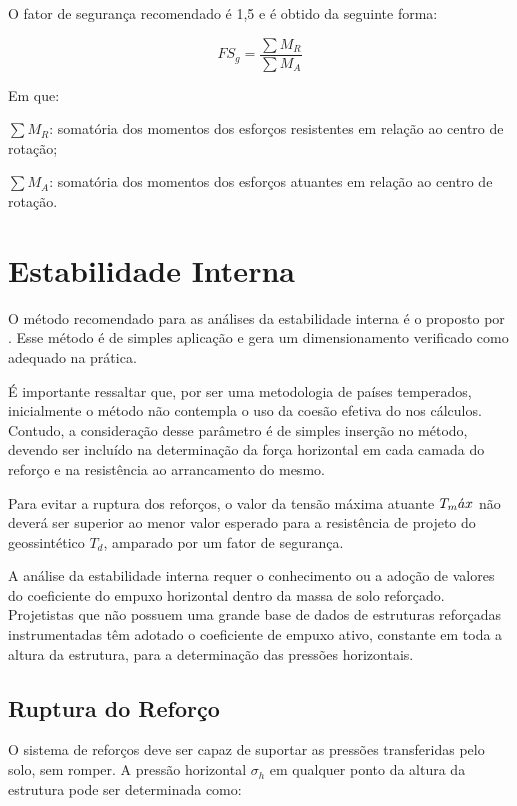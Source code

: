O fator de segurança recomendado é 1,5 e é obtido da seguinte forma:

\begin{equation}
    FS_g = \frac{\sum M_R}{\sum M_A}
\end{equation}

Em que:

$\sum M_R$: somatória dos momentos dos esforços resistentes em relação ao centro de rotação;

$\sum M_A$: somatória dos momentos dos esforços atuantes em relação ao centro de rotação.
 
 
\section{Estabilidade Interna}
 
O método recomendado para as análises da estabilidade interna é o proposto por . Esse método é de simples aplicação e gera um dimensionamento verificado como adequado na prática.

É importante ressaltar que, por ser uma metodologia de países temperados, inicialmente o método não contempla o uso da coesão efetiva do nos cálculos. Contudo, a consideração desse parâmetro é de simples inserção no método, devendo ser incluído na determinação da força horizontal em cada camada do reforço e na resistência ao arrancamento do mesmo.
 
 Para evitar a ruptura dos reforços, o valor da tensão máxima atuante $T_m\Acute{a}x$ não deverá ser superior ao menor valor esperado para a resistência de projeto do geossintético $T_d$, amparado por um fator de segurança.
 
 A análise da estabilidade interna requer o conhecimento ou a adoção de valores do coeficiente do empuxo horizontal dentro da massa de solo reforçado. Projetistas que não possuem uma grande base de dados de estruturas reforçadas instrumentadas têm adotado o coeficiente de empuxo ativo, constante em toda a altura da estrutura, para a determinação das pressões horizontais.
 
 \subsection{Ruptura do Reforço}
 
 O sistema de reforços deve ser capaz de suportar as pressões transferidas pelo solo, sem romper. A pressão horizontal $\sigma_h$ em qualquer ponto da altura da estrutura pode ser determinada como: 
 
